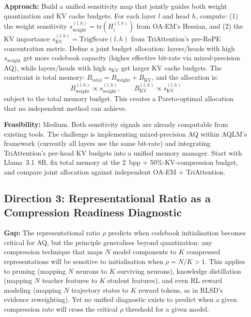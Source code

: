 \documentclass[11pt]{article}
\begin{document}
\textbf{Approach:} Build a unified sensitivity map that jointly guides both weight quantization and KV cache budgets. For each layer $l$ and head $h$, compute: (1) the weight sensitivity $s_{\mathrm{weight}}^{(l,h)} = \mathrm{tr}(H_{i}^{(l,h)})$ from OA-EM's Hessian, and (2) the KV importance $s_{\mathrm{KV}}^{(l,h)} = \mathrm{TrigScore}(l, h)$ from TriAttention's pre-RoPE concentration metric. Define a joint budget allocation: layers/heads with high $s_{\mathrm{weight}}$ get more codebook capacity (higher effective bit-rate via mixed-precision AQ), while layers/heads with high $s_{\mathrm{KV}}$ get larger KV cache budgets. The constraint is total memory: $B_{\mathrm{total}} = B_{\mathrm{weight}} + B_{\mathrm{KV}}$, and the allocation is:
\begin{equation}
    B_{\mathrm{weight}}^{(l,h)} \propto s_{\mathrm{weight}}^{(l,h)}, \qquad B_{\mathrm{KV}}^{(l,h)} \propto s_{\mathrm{KV}}^{(l,h)}
\end{equation}
subject to the total memory budget. This creates a Pareto-optimal allocation that no independent method can achieve.

\textbf{Feasibility:} Medium. Both sensitivity signals are already computable from existing tools. The challenge is implementing mixed-precision AQ within AQLM's framework (currently all layers use the same bit-rate) and integrating TriAttention's per-head KV budgets into a unified memory manager. Start with Llama~3.1~8B, fix total memory at the 2~bpp + 50\%-KV-compression budget, and compare joint allocation against independent OA-EM + TriAttention.

\subsection{Direction 3: Representational Ratio as a Compression Readiness Diagnostic}

\textbf{Gap:} The representational ratio $\rho$ predicts when codebook initialisation becomes critical for AQ, but the principle generalises beyond quantization: any compression technique that maps $N$ model components to $K$ compressed representations will be sensitive to initialisation when $\rho = N/K > 1$. This applies to pruning (mapping $N$ neurons to $K$ surviving neurons), knowledge distillation (mapping $N$ teacher features to $K$ student features), and even RL reward modeling (mapping $N$ trajectory states to $K$ reward tokens, as in RLSD's~\cite{rlsd} evidence reweighting). Yet no unified diagnostic exists to predict when a given compression rate will cross the critical $\rho$ threshold for a given model.
\end{document}
